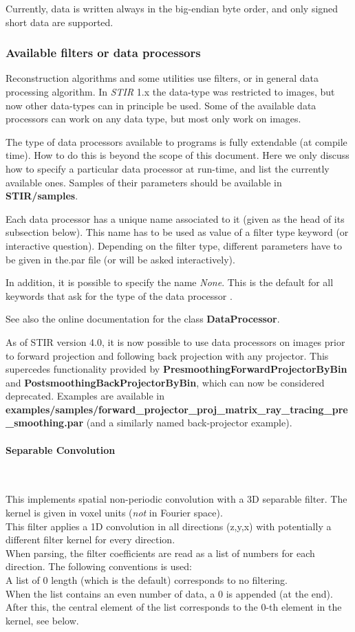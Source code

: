 \documentclass{article}
\newcommand{\tab}{\hspace{5mm}}
\newcommand{\subsubsubsection}[1]{\paragraph{#1}\mbox{} \\}
\begin{document}
{{Currently, data is written always in the big-endian byte order, 
and only signed short data are supported.



\subsubsection{
Available filters or data processors}
\label{sec:filters}
Reconstruction algorithms and some utilities use filters, or in 
general data processing algorithm. In \textit{STIR} 1.x the data-type was restricted
to images, but now other data-types can in principle be used. Some
of the available data processors can work on any data type, but most
only work on images.

The type of data processors 
available to programs is fully extendable (at compile time). 
How to do this is beyond the scope of this document. Here we 
only discuss how to specify a particular data processor at run-time, 
and list the currently available ones. Samples of their parameters 
should be available in \textbf{STIR/samples}.


Each data processor has a unique name associated to it (given 
as the head of its subsection below). This name has to be used 
as value of a filter type keyword (or interactive question). 
Depending on the filter type, different parameters have to be 
given in the.par file (or will be asked interactively).


In addition, it is possible to specify the name \textit{None}. This 
is the default for all keywords that ask for the type of 
the data processor .


See also the online documentation for the class \textbf{DataProcessor}.

As of STIR version 4.0, it is now possible to use data processors 
on images prior to forward projection and following back projection
with any projector. This supercedes functionality provided by 
 \textbf{PresmoothingForwardProjectorByBin} and 
 \textbf{PostsmoothingBackProjectorByBin},
  which can now be considered deprecated. Examples are available
in \textbf{examples/samples/forward\_projector\_proj\_matrix\_ray\_tracing\_pre\_smoothing.par} 
(and a similarly named back-projector example).

{ \subsubsubsection{Separable Convolution}
}
This implements spatial non-periodic convolution with a 3D separable 
filter. The kernel is given in voxel units (\textit{not} in Fourier 
space).\\
This filter applies a 1D convolution in all directions (z,y,x) 
with potentially a different filter kernel for every direction.\\
When parsing, the filter coefficients are read as a list of numbers 
for each direction. The following conventions is used:\\
{\textbullet}\tab 
A list of 0 length (which is the default) corresponds to no filtering.\\
{\textbullet}\tab When the list contains an even number of data, a 0 is 
appended (at the end).\\
{\textbullet}\tab 
After this, the central element of the list corresponds to the 
0-th element in the kernel, see below.


}}
\end{document}
